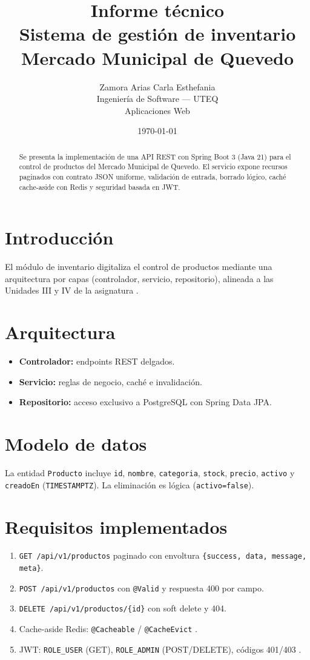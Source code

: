 \documentclass[12pt,a4paper]{article}
\title{Informe t\'ecnico\\Sistema de gesti\'on de inventario\\Mercado Municipal de Quevedo}
\author{Zamora Arias Carla Esthefania\\Ingenier\'ia de Software --- UTEQ\\Aplicaciones Web}
\date{\today}
\begin{document}
\maketitle

\begin{abstract}
Se presenta la implementaci\'on de una API REST con Spring Boot 3 (Java 21) para el control de productos del Mercado Municipal de Quevedo. El servicio expone recursos paginados con contrato JSON uniforme, validaci\'on de entrada, borrado l\'ogico, cach\'e cache-aside con Redis y seguridad basada en JWT.
\end{abstract}

\section{Introducci\'on}
El m\'odulo de inventario digitaliza el control de productos mediante una arquitectura por capas (controlador, servicio, repositorio), alineada a las Unidades III y IV de la asignatura \cite{walls2022,martin2017}.

\section{Arquitectura}
\begin{itemize}
  \item \textbf{Controlador:} endpoints REST delgados.
  \item \textbf{Servicio:} reglas de negocio, cach\'e e invalidaci\'on.
  \item \textbf{Repositorio:} acceso exclusivo a PostgreSQL con Spring Data JPA.
\end{itemize}

\section{Modelo de datos}
La entidad \texttt{Producto} incluye \texttt{id}, \texttt{nombre}, \texttt{categoria}, \texttt{stock}, \texttt{precio}, \texttt{activo} y \texttt{creadoEn} (\texttt{TIMESTAMPTZ}). La eliminaci\'on es l\'ogica (\texttt{activo=false}).

\section{Requisitos implementados}
\begin{enumerate}
  \item \texttt{GET /api/v1/productos} paginado con envoltura \texttt{\{success, data, message, meta\}}.
  \item \texttt{POST /api/v1/productos} con \texttt{@Valid} y respuesta 400 por campo.
  \item \texttt{DELETE /api/v1/productos/\{id\}} con soft delete y 404.
  \item Cache-aside Redis: \texttt{@Cacheable} / \texttt{@CacheEvict} \cite{kleppmann2017}.
  \item JWT: \texttt{ROLE\_USER} (GET), \texttt{ROLE\_ADMIN} (POST/DELETE), c\'odigos 401/403 \cite{rfc7519}.
\end{enumerate}
\end{document}
